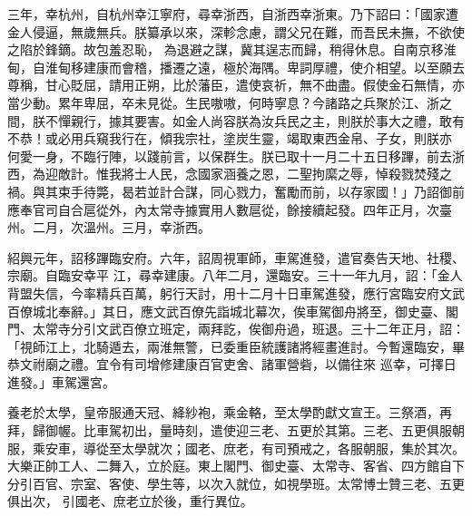 \begin{pinyinscope}
 三年，幸杭州，自杭州幸江寧府，尋幸浙西，自浙西幸浙東。乃下詔曰：「國家遭金人侵逼，無歲無兵。朕纂承以來，深軫念慮，謂父兄在難，而吾民未撫，不欲使之陷於鋒鏑。故包羞忍恥，
 為退避之謀，冀其逞志而歸，稍得休息。自南京移淮甸，自淮甸移建康而會稽，播遷之遠，極於海隅。卑詞厚禮，使介相望。以至願去尊稱，甘心貶屈，請用正朔，比於藩臣，遣使哀祈，無不曲盡。假使金石無情，亦當少動。累年卑屈，卒未見從。生民嗷嗷，何時寧息？今諸路之兵聚於江、浙之間，朕不憚親行，據其要害。如金人尚容朕為汝兵民之主，則朕於事大之禮，敢有不恭！或必用兵窺我行在，傾我宗社，塗炭生靈，竭取東西金帛、子女，則朕亦
 何愛一身，不臨行陣，以踐前言，以保群生。朕已取十一月二十五日移蹕，前去浙西，為迎敵計。惟我將士人民，念國家涵養之恩，二聖拘縻之辱，悼殺戮焚殘之禍。與其束手待斃，曷若並計合謀，同心戮力，奮勵而前，以存家國！」乃詔御前應奉官司自合扈從外，內太常寺據實用人數扈從，餘接續起發。四年正月，次臺州。二月，次溫州。三月，幸浙西。



 紹興元年，詔移蹕臨安府。六年，詔周視軍師，車駕進發，遣官奏告天地、社稷、宗廟。自臨安幸平
 江，尋幸建康。八年二月，還臨安。三十一年九月，詔：「金人背盟失信，今率精兵百萬，躬行天討，用十二月十日車駕進發，應行宮臨安府文武百僚城北奉辭。」其日，應文武百僚先詣城北幕次，俟車駕御舟將至，御史臺、閣門、太常寺分引文武百僚立班定，兩拜訖，俟御舟過，班退。三十二年正月，詔：「視師江上，北騎遁去，兩淮無警，已委重臣統護諸將經畫進討。今暫還臨安，畢恭文祔廟之禮。宜令有司增修建康百官吏舍、諸軍營砦，以備往來
 巡幸，可擇日進發。」車駕還宮。



 養老於太學，皇帝服通天冠、絳紗袍，乘金輅，至太學酌獻文宣王。三祭酒，再拜，歸御幄。比車駕初出，量時刻，遣使迎三老、五更於其第。三老、五更俱服朝服，乘安車，導從至太學就次；國老、庶老，有司預戒之，各服朝服，集於其次。大樂正帥工人、二舞入，立於庭。東上閣門、御史臺、太常寺、客省、四方館自下分引百官、宗室、客使、學生等，以次入就位，如視學班。太常博士贊三老、五更俱出次，
 引國老、庶老立於後，重行異位。




\end{pinyinscope}
